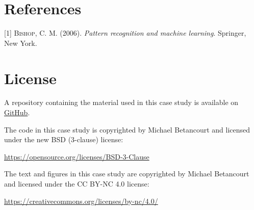 \documentclass[]{article}
\begin{document}
\hypertarget{references}{%
\section*{References}\label{references}}

\hypertarget{refs}{}
\leavevmode\hypertarget{ref-Bishop:2006}{}%
{[}1{]} \textsc{Bishop}, C. M. (2006). \emph{Pattern recognition and
machine learning}. Springer, New York.

\hypertarget{license}{%
\section*{License}\label{license}}

A repository containing the material used in this case study is
available on
\href{https://github.com/betanalpha/knitr_case_studies/tree/master/probability_on_product_spaces}{GitHub}.

The code in this case study is copyrighted by Michael Betancourt and
licensed under the new BSD (3-clause) license:

\url{https://opensource.org/licenses/BSD-3-Clause}

The text and figures in this case study are copyrighted by Michael
Betancourt and licensed under the CC BY-NC 4.0 license:

\url{https://creativecommons.org/licenses/by-nc/4.0/}
\end{document}
